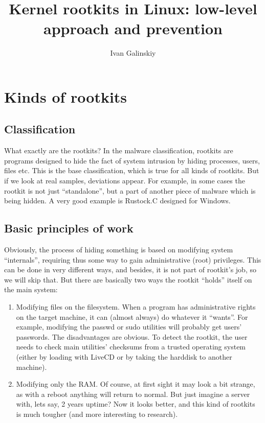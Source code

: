 \documentclass[12pt]{article}
\title{Kernel rootkits in Linux: low-level approach and prevention}
\date{}
\author{Ivan Galinskiy}
\begin{document}
  \maketitle
  
  \section{Kinds of rootkits}
  \subsection{Classification}
  What exactly are the rootkits? In the malware classification, rootkits are
  programs designed to hide the fact of system intrusion by hiding processes,
  users, files etc. This is the base classification, which is true for all
  kinds of rootkits. But if we look at real samples, deviations appear. For
  example, in some cases the rootkit is not just ``standalone'', but a part of
  another piece of malware which is being hidden. A very good example is
  Rustock.C designed for Windows.

  \subsection{Basic principles of work}
  Obviously, the process of hiding something is based on modifying system
  ``internals'', requiring thus some way to gain administrative (root)
  privileges. This can be done in very different ways, and besides, it is not
  part of rootkit's job, so we will skip that. But there are basically two
  ways the rootkit ``holds'' itself on the main system:
  \begin{enumerate}
    \item Modifying files on the filesystem. When a program has administrative
      rights on the target machine, it can (almost always) do whatever it
      ``wants''. For example, modifying the passwd or sudo utilities will
      probably get users' passwords. The disadvantages are obvious. To detect
      the rootkit, the user needs to check main utilities' checksums from a
      trusted operating system (either by loading with LiveCD or by taking the
      harddisk to another machine).

    \item Modifying only the RAM. Of course, at first sight it may look a bit
      strange, as with a reboot anything will return to normal. But just
      imagine a server with, lets say, 2 years uptime? Now it looks better,
      and this kind of rootkits is much tougher (and more interesting to
      research).
  \end{enumerate}
\end{document}
